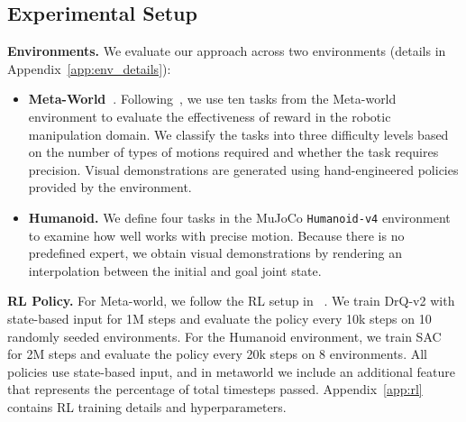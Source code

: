 \subsection{Experimental Setup}
\textbf{Environments.} We evaluate our approach across two environments (details in Appendix~\ref{app:env_details}):
\begin{itemize}[nosep, leftmargin=*]
    \item \textbf{Meta-World~\cite{yu2021metaworldbenchmarkevaluationmultitask}}. Following~\citet{fu2024robot}, we use ten tasks from the Meta-world environment to evaluate the effectiveness of \ours{} reward in the robotic manipulation domain. 
    We classify the tasks into three difficulty levels based on the number of types of motions required and whether the task requires precision. Visual demonstrations are generated using hand-engineered policies provided by the environment.
    \item \textbf{Humanoid.} We define four tasks in the MuJoCo \texttt{Humanoid-v4} environment~\citep{mujoco} to examine how well \ours{} works with precise motion. Because there is no predefined expert, we obtain visual demonstrations by rendering an interpolation between the initial and goal joint state.
\end{itemize}

\textbf{RL Policy.} For Meta-world, we follow the RL setup in ~\citet{fu2024robot}. We train DrQ-v2 \cite{yarats2021masteringvisualcontinuouscontrol} with state-based input for 1M steps and evaluate the policy every 10k steps on 10 randomly seeded environments. 
For the Humanoid environment, we train SAC~\cite{haarnoja2018softactorcriticoffpolicymaximum} for 2M steps and evaluate the policy every 20k steps on 8 environments.
All policies use state-based input, and in metaworld we include an additional feature that represents the percentage of total timesteps passed. 
Appendix~\ref{app:rl} contains RL training details and hyperparameters.

